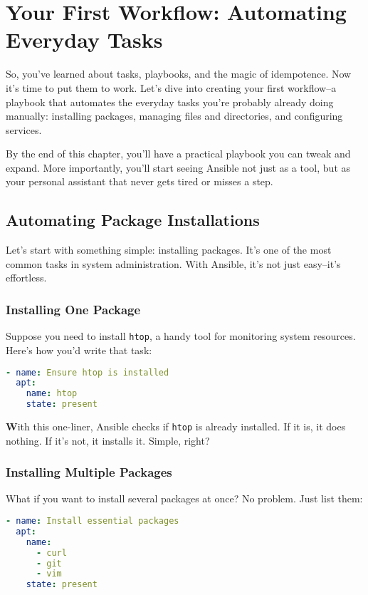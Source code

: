\chapter{Your First Workflow: Automating Everyday Tasks}

So, you've learned about tasks, playbooks, and the magic of idempotence. Now it's time to put them to work. Let's dive into creating your first workflow--a playbook that automates the everyday tasks you're probably already doing manually: installing packages, managing files and directories, and configuring services.

By the end of this chapter, you'll have a practical playbook you can tweak and expand. More importantly, you'll start seeing Ansible not just as a tool, but as your personal assistant that never gets tired or misses a step.

\section{Automating Package Installations}

Let's start with something simple: installing packages. It's one of the most common tasks in system administration. With Ansible, it's not just easy--it's effortless.

\subsection{Installing One Package}

Suppose you need to install \texttt{htop}, a handy tool for monitoring system resources. Here's how you'd write that task:
\begin{lstlisting}[language=yaml, caption=Installing a Single Package]
- name: Ensure htop is installed
  apt:
    name: htop
    state: present
\end{lstlisting}

\textbf{W}ith this one-liner, Ansible checks if \texttt{htop} is already installed. If it is, it does nothing. If it's not, it installs it. Simple, right?

\subsection{Installing Multiple Packages}

What if you want to install several packages at once? No problem. Just list them:
\begin{lstlisting}[language=yaml, caption=Installing Multiple Packages]
- name: Install essential packages
  apt:
    name:
      - curl
      - git
      - vim
    state: present
\end{lstlisting}


